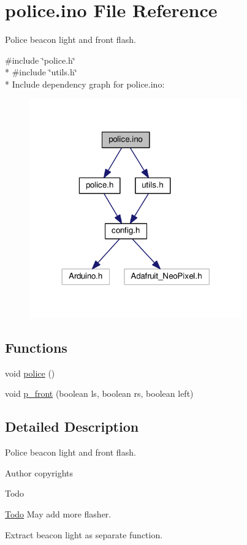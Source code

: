 \hypertarget{police_8ino}{}\section{police.\+ino File Reference}
\label{police_8ino}


Police beacon light and front flash.  


{\ttfamily \#include \char`\"{}police.\+h\char`\"{}}\\*
{\ttfamily \#include \char`\"{}utils.\+h\char`\"{}}\\*
Include dependency graph for police.\+ino\+:\nopagebreak
\begin{figure}[H]
\begin{center}
\leavevmode
\includegraphics[width=260pt]{police_8ino__incl}
\end{center}
\end{figure}
\subsection*{Functions}
{\bf }\par
\begin{DoxyCompactItemize}
\item 
void \hyperlink{group__police_ga55d627c45708bc26866e27d49432eee9}{police} ()
\item 
void \hyperlink{group__police_ga82542db5e1a84d584a1725f36caaf71e}{p\+\_\+front} (boolean ls, boolean rs, boolean left)
\end{DoxyCompactItemize}



\subsection{Detailed Description}
Police beacon light and front flash. 

\begin{DoxyAuthor}{Author}
copyrights 
\end{DoxyAuthor}
\begin{DoxyRefDesc}{Todo}
\item[\hyperlink{todo__todo000003}{Todo}]May add more flasher. 

Extract beacon light as separate function. \end{DoxyRefDesc}
